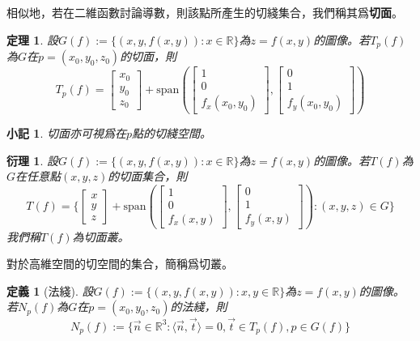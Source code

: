 \documentclass[12pt]{article}
\newcommand{\innerprod}[2]{\langle{#1},{#2}\rangle}
\newtheorem{definition}{定義}
\newtheorem*{theorem}{定理}
\newtheorem*{corollary}{衍理}
\newtheorem*{remark}{小記}
\begin{document}
    相似地，若在二維函數討論導數，則該點所產生的切綫集合，我們稱其爲\textbf{切面}。

    \begin{theorem}
        設$G(f):=\{(x,y,f(x,y)):x\in\mathbb{R}\}$為$z=f(x,y)$的圖像。若$T_p(f)$為$G$在$p=(x_0,y_0,z_0)$的切面，則$$T_p(f)=\begin{bmatrix}
            x_0\\y_0\\z_0
        \end{bmatrix}+\mathrm{span}(\begin{bmatrix}
            1\\0\\f_x(x_0,y_0)
        \end{bmatrix},\begin{bmatrix}
            0\\1\\f_y(x_0,y_0)
        \end{bmatrix})$$
    \end{theorem}

    \begin{remark}
        切面亦可視爲在$p$點的切綫空間。
    \end{remark}

    \begin{corollary}
        設$G(f):=\{(x,y,f(x,y)):x\in\mathbb{R}\}$為$z=f(x,y)$的圖像。若$T(f)$為$G$在任意點$(x,y,z)$的切面集合，則$$T(f)=\{\begin{bmatrix}
            x\\y\\z
        \end{bmatrix}+\mathrm{span}(\begin{bmatrix}
            1\\0\\f_x(x,y)
        \end{bmatrix},\begin{bmatrix}
            0\\1\\f_y(x,y)
        \end{bmatrix}): (x,y,z)\in G\}$$
        我們稱$T(f)$為切面叢。
    \end{corollary}

    對於高維空間的切空間的集合，簡稱爲切叢。

    \begin{definition}[法綫]
        設$G(f):=\{(x,y,f(x,y)):x,y\in\mathbb{R}\}$為$z=f(x,y)$的圖像。若$N_p(f)$為$G$在$p=(x_0,y_0,z_0)$的法綫，則$$N_p(f):=\{\vec{n}\in\mathbb{R}^3:\innerprod{\vec{n}}{\vec{t}}=0, \vec{t}\in T_p(f), p\in G(f)\}$$
    \end{definition}
\end{document}
